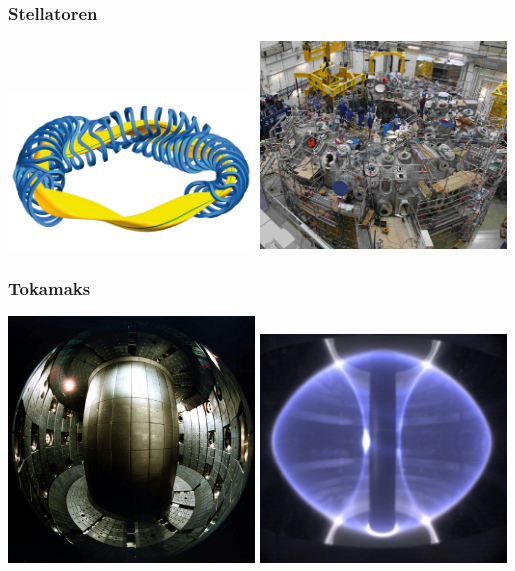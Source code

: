 \documentclass[aspectratio=169]{beamer}
\begin{document}
      \begin{frame}
        \frametitle{Stellatoren}

        \includegraphics[width=0.49\textwidth]{figs/stellator} \includegraphics[width=0.49\textwidth]{figs/wendelstein}


      \end{frame}

      \begin{frame}
        \frametitle{Tokamaks}

        \includegraphics[width=0.49\textwidth]{figs/tokamak_innen} \includegraphics[width=0.49\textwidth]{figs/tokamak}


      \end{frame}
\end{document}
